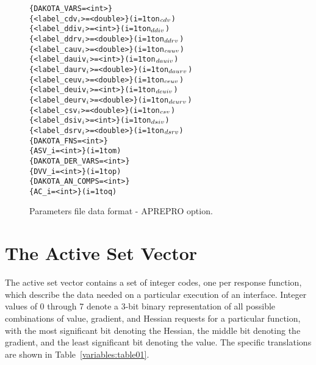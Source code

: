 \begin{figure}
  \begin{bigbox}
  \centering
  \begin{alltt}
    \{ DAKOTA_VARS = <int> \}
    \{ <label_cdv\(\sb{i}\)> = <double> \}         (i = 1 to n\(\sb{cdv}\))
    \{ <label_ddiv\(\sb{i}\)> = <int> \}           (i = 1 to n\(\sb{ddiv}\))
    \{ <label_ddrv\(\sb{i}\)> = <double> \}        (i = 1 to n\(\sb{ddrv}\))
    \{ <label_cauv\(\sb{i}\)> = <double> \}        (i = 1 to n\(\sb{cauv}\))
    \{ <label_dauiv\(\sb{i}\)> = <int> \}          (i = 1 to n\(\sb{dauiv}\))
    \{ <label_daurv\(\sb{i}\)> = <double> \}       (i = 1 to n\(\sb{daurv}\))
    \{ <label_ceuv\(\sb{i}\)> = <double> \}        (i = 1 to n\(\sb{ceuv}\))
    \{ <label_deuiv\(\sb{i}\)> = <int> \}          (i = 1 to n\(\sb{deuiv}\))
    \{ <label_deurv\(\sb{i}\)> = <double> \}       (i = 1 to n\(\sb{deurv}\))
    \{ <label_csv\(\sb{i}\)> = <double> \}         (i = 1 to n\(\sb{csv}\))
    \{ <label_dsiv\(\sb{i}\)> = <int> \}           (i = 1 to n\(\sb{dsiv}\))
    \{ <label_dsrv\(\sb{i}\)> = <double> \}        (i = 1 to n\(\sb{dsrv}\)) \color{blue}
    \{ DAKOTA_FNS = <int> \}
    \{ ASV_i = <int> \}                   (i = 1 to m) \color{red}
    \{ DAKOTA_DER_VARS = <int> \}
    \{ DVV_i = <int> \}                   (i = 1 to p) \color{green}
    \{ DAKOTA_AN_COMPS = <int> \}
    \{ AC_i = <int> \}                    (i = 1 to q)
  \end{alltt}
  \end{bigbox}
  \caption{Parameters file data format - APREPRO option.}
  \label{variables:figure02}
\end{figure}

\section{The Active Set Vector}\label{variables:asv}

The active set vector contains a set of integer codes, one per
response function, which describe the data needed on a particular
execution of an interface. Integer values of 0 through 7 denote a
3-bit binary representation of all possible combinations of value,
gradient, and Hessian requests for a particular function, with the
most significant bit denoting the Hessian, the middle bit denoting the
gradient, and the least significant bit denoting the value. The
specific translations are shown in Table~\ref{variables:table01}.

